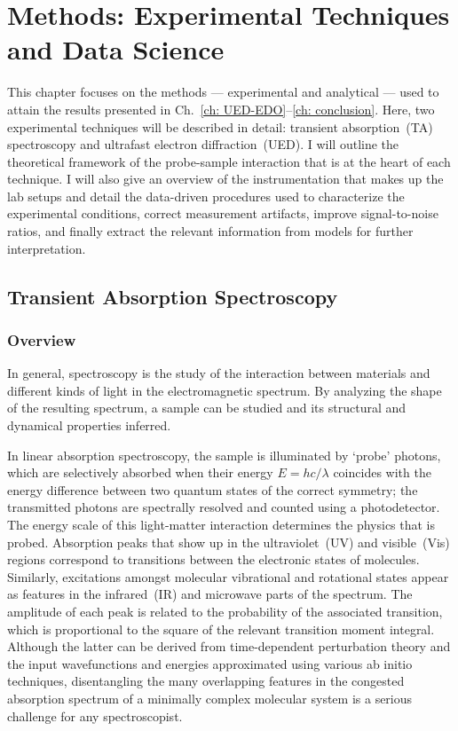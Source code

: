 
\chapter{Methods: Experimental Techniques and Data Science}
\label{ch: methods}

This chapter focuses on the methods --- experimental and analytical --- used to
attain the results presented in Ch.~\ref{ch: UED-EDO}--\ref{ch: conclusion}.
Here, two experimental techniques will be described in detail:
transient absorption~(TA) spectroscopy and ultrafast electron diffraction~(UED).
I will outline the theoretical framework of the probe-sample interaction
that is at the heart of each technique.
I will also give an overview of the instrumentation that makes up the lab setups
and detail the data-driven procedures used to characterize the experimental conditions,
correct measurement artifacts, improve signal-to-noise ratios, and finally extract the
relevant information from models for further interpretation.


\section{Transient Absorption Spectroscopy}
\label{sec: TA}

\subsection{Overview}
\label{sec: TA-overview}

In general, spectroscopy is the study of the interaction between materials and
different kinds of light in the electromagnetic spectrum.
By analyzing the shape of the resulting spectrum,
a sample can be studied and its structural and dynamical properties inferred.

In linear absorption spectroscopy, the sample is
illuminated by `probe' photons, which are selectively absorbed when
their energy $E = hc/\lambda$ coincides with the energy difference between
two quantum states of the correct symmetry;
the transmitted photons are spectrally resolved and counted using
a photodetector. The energy scale of this light-matter interaction determines
the physics that is probed. Absorption peaks that show
up in the ultraviolet~(UV) and visible~(Vis) regions correspond to transitions
between the electronic states of molecules. Similarly, excitations amongst
molecular vibrational and rotational states appear as features in the infrared~(IR)
and microwave parts of the spectrum. The amplitude of each peak is related to
the probability of the associated transition, which is proportional to
the square of the relevant transition moment integral.
Although the latter can be derived from time-dependent perturbation theory
and the input wavefunctions and energies approximated using various ab initio techniques,
disentangling the many overlapping features in the congested absorption spectrum of
a minimally complex molecular system is a serious challenge for any spectroscopist.

